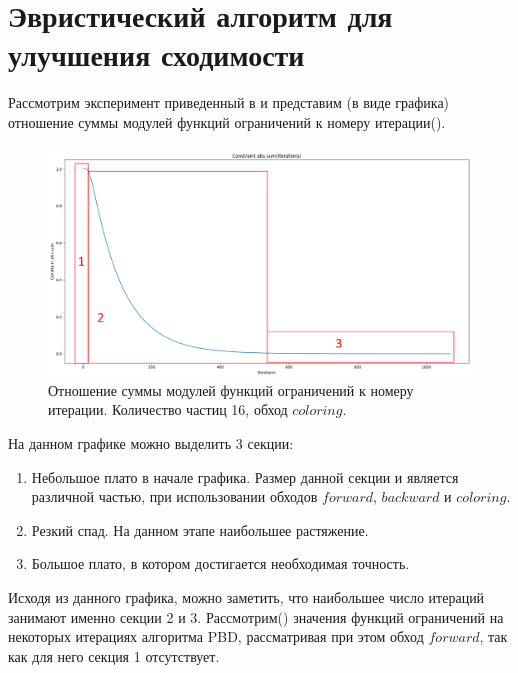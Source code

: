 \section{Эвристический алгоритм для улучшения сходимости} \label{ch3:heuristic}
	Рассмотрим эксперимент приведенный в  и представим (в виде графика) отношение суммы модулей функций ограничений к номеру итерации(). 

\begin{figure}[ht!] 
	\center
	\includegraphics [scale=0.4] {my_folder/images//plot_16_coloring.png}
	\caption{Отношение суммы модулей функций ограничений к номеру итерации. Количество частиц 16, обход $coloring$.}
	\label{fig:csum-over-iterations}  
\end{figure}	

	На данном графике можно выделить 3 секции:
	\begin{enumerate}[1.]
		\item Небольшое плато в начале графика. Размер данной секции и является различной частью, при использовании обходов $forward$, $backward$ и $coloring$.
		\item Резкий спад. На данном этапе   наибольшее растяжение.
		\item Большое плато, в котором достигается необходимая точность.
	\end{enumerate}

	Исходя из данного графика, можно заметить, что наибольшее число итераций занимают именно секции 2 и 3. Рассмотрим() значения функций ограничений на некоторых итерациях алгоритма PBD, рассматривая при этом обход $forward$, так как для него секция 1 отсутствует.
	

